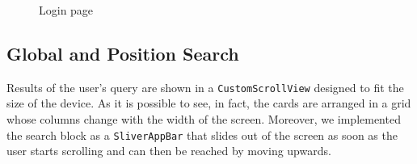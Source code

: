 \begin{figure}[H]
      \centering
      \caption{Login page}
\end{figure}

\clearpage
\subsection{Global and Position Search}
Results of the user's query are shown in a \texttt{CustomScrollView} designed to fit the size of the device.
As it is possible to see, in fact, the cards are arranged in a grid whose columns change with the width of the screen.
Moreover, we implemented the search block as a \texttt{SliverAppBar} that slides out of the screen 
as soon as the user starts scrolling and can then be reached by moving upwards.

